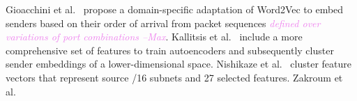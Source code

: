 \documentclass[manuscript,nonacm]{acmart}
\newcommand{\maxnote}[1]{\textit{\textcolor{violet}{#1 --Max}}}
\begin{document}






Gioacchini et al.~\cite{2021gioacchini,2023gioacchini} propose a domain-specific adaptation of Word2Vec to embed senders based on their order of arrival from packet sequences \maxnote{defined over variations of port combinations}.
Kallitsis et al.~\cite{2022kallitsis} include a more comprehensive set of features to train autoencoders and subsequently cluster sender embeddings of a lower-dimensional space. 
Nishikaze et al.~\cite{2015nishikaze} cluster feature vectors that represent source /16 subnets and 27 selected features.
Zakroum et al.~\cite{2023zakroum} 
\end{document}
